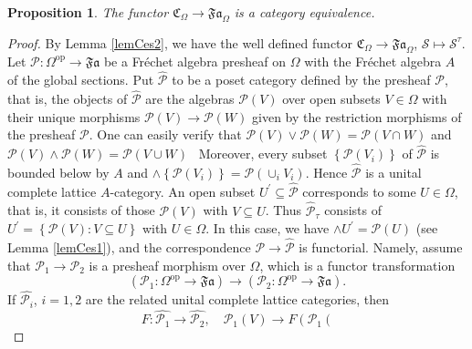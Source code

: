 \documentclass[12pt]{amsart}%
\theoremstyle{plain}
\newtheorem{proposition}{Proposition}
\numberwithin{equation}{section}
\numberwithin{equation}{section}
\numberwithin{theorem}{section}
\numberwithin{lemma}{section}
\numberwithin{remark}{section}
\numberwithin{example}{section}
\numberwithin{proposition}{section}
\numberwithin{definition}{section}
\numberwithin{corollary}{section}
\begin{document}
\begin{proposition}
\label{corCes1}The functor $\mathfrak{C}_{\Omega}\rightarrow\mathfrak{Fa}%
_{\Omega}$ is a category equivalence.
\end{proposition}

\begin{proof}
By Lemma \ref{lemCes2}, we have the well defined functor $\mathfrak{C}%
_{\Omega}\rightarrow\mathfrak{Fa}_{\Omega}$, $\mathcal{S\mapsto S}^{\tau}$.
Let $\mathcal{P}:\Omega^{\operatorname{op}}\rightarrow\mathfrak{Fa}$ be a
Fr\'{e}chet algebra presheaf on $\Omega$ with the Fr\'{e}chet algebra $A$ of
the global sections. Put $\widehat{\mathcal{P}}$ to be a poset category
defined by the presheaf $\mathcal{P}$, that is, the objects of
$\widehat{\mathcal{P}}$ are the algebras $\mathcal{P}\left(  V\right)  $ over
open subsets $V\in\Omega$ with their unique morphisms $\mathcal{P}\left(
V\right)  \rightarrow\mathcal{P}\left(  W\right)  $ given by the restriction
morphisms of the presheaf $\mathcal{P}$. One can easily verify that
$\mathcal{P}\left(  V\right)  \vee\mathcal{P}\left(  W\right)  =\mathcal{P}%
\left(  V\cap W\right)  $ and $\mathcal{P}\left(  V\right)  \wedge
\mathcal{P}\left(  W\right)  =\mathcal{P}\left(  V\cup W\right)  $ \ Moreover,
every subset $\left\{  \mathcal{P}\left(  V_{i}\right)  \right\}  $ of
$\widehat{\mathcal{P}}$ is bounded below by $A$ and $\wedge\left\{
\mathcal{P}\left(  V_{i}\right)  \right\}  =\mathcal{P}\left(  \cup_{i}%
V_{i}\right)  $. Hence $\widehat{\mathcal{P}}$ is a unital complete lattice
$A$-category. An open subset $U^{\prime}\subseteq\widehat{\mathcal{P}}$
corresponds to some $U\in\Omega$, that is, it consists of those $\mathcal{P}%
\left(  V\right)  $ with $V\subseteq U$. Thus $\widehat{\mathcal{P}}_{\tau}$
consists of $U^{\prime}=\left\{  \mathcal{P}\left(  V\right)  :V\subseteq
U\right\}  $ with $U\in\Omega$. In this case, we have $\wedge U^{\prime
}=\mathcal{P}\left(  U\right)  $ (see Lemma \ref{lemCes1}), and the
correspondence $\mathcal{P}\longrightarrow\widehat{\mathcal{P}}$ is
functorial. Namely, assume that $\mathcal{P}_{1}\rightarrow\mathcal{P}_{2}$ is
a presheaf morphism over $\Omega$, which is a functor transformation
\[
\left(  \mathcal{P}_{1}:\Omega^{\operatorname{op}}\rightarrow\mathfrak{Fa}%
\right)  \rightarrow\left(  \mathcal{P}_{2}:\Omega^{\operatorname{op}%
}\rightarrow\mathfrak{Fa}\right)  .
\]
If $\widehat{\mathcal{P}_{i}}$, $i=1,2$ are the related unital complete
lattice categories, then%
\[
F:\widehat{\mathcal{P}_{1}}\rightarrow\widehat{\mathcal{P}_{2}},\quad
\mathcal{P}_{1}\left(  V\right)  \rightarrow F\left(  \mathcal{P}_{1}\left(
\]
\end{proof}
\end{document}
